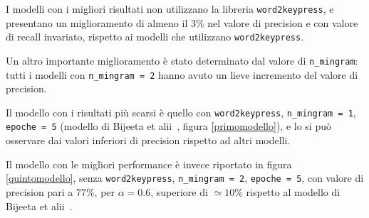 I modelli con i migliori risultati non utilizzano la libreria \texttt{word2keypress}, e presentano un miglioramento di almeno il 3\% nel valore di precision e con valore di recall invariato, rispetto ai modelli che utilizzano \texttt{word2keypress}.

Un altro importante miglioramento è stato determinato dal valore di \texttt{n\_mingram}: tutti i modelli con \texttt{n\_mingram = 2} hanno avuto un lieve incremento del valore di precision.

Il modello con i risultati più scarsi è quello con \texttt{word2keypress}, \texttt{n\_mingram = 1}, \texttt{epoche = 5} (modello di Bijeeta et
alii~\cite{biijeta}, figura \ref{primomodello}), e lo si può osservare dai valori inferiori di precision rispetto ad altri modelli.

Il modello con le migliori performance è invece riportato in figura \ref{quintomodello}, senza \texttt{word2keypress}, \texttt{n\_mingram = 2}, \texttt{epoche = 5}, con valore di precision pari a 77\%, per $\alpha = 0.6$, superiore di $\simeq 10\%$ rispetto al modello di Bijeeta et alii~\cite{biijeta}.


